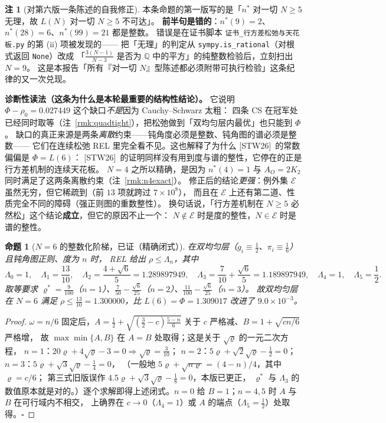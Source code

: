 \documentclass[UTF8,11pt]{ctexart}
\newtheorem{proposition}[theorem]{命题}
\theoremstyle{definition}
\newtheorem{remark}[theorem]{注}
\newcommand{\Lam}{\Lambda}
\newcommand{\Q}{\mathbb{Q}}
\newcommand{\STW}{\textup{[STW26]}}
\begin{document}
\begin{remark}[对第六版一条陈述的自我修正]\label{rmk:fracdegfix}
本条命题的第一版写的是「$n^*$ 对一切 $N\ge5$ 无理，故 $L(N)$ 对一切 $N\ge5$ 不可达」。
\textbf{前半句是错的}：$n^*(9)=2$、$n^*(28)=6$、$n^*(99)=21$ 都是整数。
错误是在证书脚本 \texttt{证书\_行方差松弛与天花板.py} 的第 (ii) 项被发现的——
把「无理」的判定从 \texttt{sympy.is\_rational}（对根式返回 \texttt{None}）改成
「$\frac{3(N-1)}{N-3}$ 是否为 $\Q$ 中的平方」的纯整数检验后，立刻扫出 $N=9$。
这是本报告「所有『对一切 $N$』型陈述都必须附带可执行检验」这条纪律的又一次兑现。

\medskip
\noindent\textbf{诊断性读法（这条为什么是本轮最重要的结构性结论）。}
它说明 $\Phi-\rho_0=0.027449$ 这个缺口\emph{不是}因为 Cauchy--Schwarz 太粗：
四条 CS 在冠军处已经同时取等（注~\ref{rmk:quadtight}），把松弛做到「双均匀层内最优」也只能到 $\Phi$。
缺口的真正来源是两条\emph{离散}约束——钝角度必须是整数、钝角图的谱必须是整数——
它们在连续松弛 REL 里完全看不见。这也解释了为什么 \STW\ 的常数偏偏是 $\Phi=L(6)$：
\STW\ 的证明同样没有用到度与谱的整性，它停在的正是行方差机制的连续天花板。
$N=4$ 之所以精确，是因为 $n^*(4)=1$ 与 $A_O=2K_2$ 同时满足了这两条离散约束（注~\ref{rmk:n4exact}）。
修正后的结论\emph{更强}：例外集 $\mathcal E$ 虽然无穷，但它稀疏到（前 $13$ 项就跨过 $7\times10^8$），
而且在 $\mathcal E$ 上还有第二道、性质完全不同的障碍（强正则图的重数整性）。
换句话说，「行方差机制在 $N\ge5$ 必然松」这个结论\textbf{成立}，但它的原因不止一个：
$N\notin\mathcal E$ 时是度的整性，$N\in\mathcal E$ 时是谱的整性。
\end{remark}

\begin{proposition}[$N=6$ 的整数化阶梯，已证（精确闭式）]\label{prop:ladder6}
在双均匀层（$g_i\equiv\frac12$、$\pi_i\equiv\frac16$）且钝角图正则、度为 $n$ 时，
REL 给出 $\rho\le\Lambda_n$，其中
\[
\Lambda_0=1,\quad \Lambda_1=\frac{13}{10},\quad \Lambda_2=\frac{4+\sqrt6}5=1.289897949,\quad
\Lambda_3=\frac7{10}+\frac{\sqrt6}5=1.189897949,\quad \Lambda_4=1,\quad \Lambda_5=\frac12 .
\]
取等要求 $\varrho^*=\frac{9}{100}$（$n=1$）、$\frac7{50}-\frac{\sqrt6}{25}$（$n=2$）、$\frac{11}{100}-\frac{\sqrt6}{25}$（$n=3$）。
故双均匀层在 $N=6$ 满足 $\rho\le\frac{13}{10}=1.300000$，比 $L(6)=\Phi=1.309017$ 改进了 $9.0\times10^{-3}$。
\end{proposition}

\begin{proof}
$\omega=n/6$ 固定后，$A=\frac12+\sqrt{(\frac32-c)\frac{5-n}6}$ 关于 $c$ 严格减、$B=1+\sqrt{cn/6}$ 严格增，
故 $\max\min\{A,B\}$ 在 $A=B$ 处取得；这是关于 $\sqrt\varrho$ 的一元二次方程，
$n=1$：$20\varrho+4\sqrt\varrho-3=0\Rightarrow\sqrt\varrho=\frac3{10}$；
$n=2$：$5\varrho+\sqrt2\sqrt\varrho-\frac12=0$；$n=3$：$5\varrho+\sqrt3\sqrt\varrho-\frac14=0$，
（一般地 $5\varrho+\sqrt{n\varrho}=(4-n)/4$，其中 $\varrho=c/6$；
第三式旧版误作 $4.5\varrho+\sqrt3\sqrt\varrho-\frac18=0$，本版已更正，
$\varrho^\ast$ 与 $\Lam_3$ 的数值原本就是对的。）逐个求解即得上述闭式。$n=0$ 给 $B=1$；$n=4,5$ 时 $A$ 与 $B$ 在可行域内不相交，
上确界在 $c\to0$（$\Lambda_4=1$）或 $A$ 的端点（$\Lambda_5=\frac12$）处取得。$\square$
\end{proof}
\end{document}
